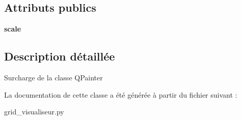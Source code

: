 \subsection*{Attributs publics}
\begin{DoxyCompactItemize}
\item 
\mbox{\label{classgrid__visualiseur_1_1MyPainter_a8edb92d9f22e2fbdf9a12e70033f6e66}} 
{\bfseries scale}
\end{DoxyCompactItemize}


\subsection{Description détaillée}
\begin{DoxyVerb}Surcharge de la classe QPainter \end{DoxyVerb}
 

La documentation de cette classe a été générée à partir du fichier suivant \+:\begin{DoxyCompactItemize}
\item 
grid\+\_\+visualiseur.\+py\end{DoxyCompactItemize}

